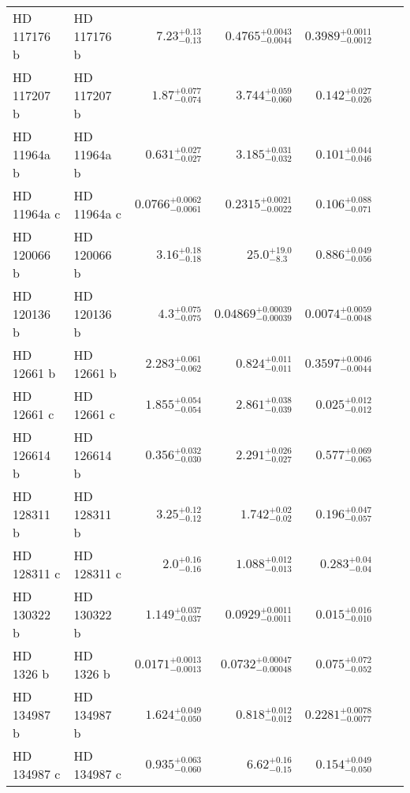 \begin{longtable*}{llrrrrr}
HD 117176 b & HD 117176 b & $7.23^{+0.13}_{-0.13}$ & $0.4765^{+0.0043}_{-0.0044}$ & $0.3989^{+0.0011}_{-0.0012}$ & \cite{Naef04} & \\ 
HD 117207 b & HD 117207 b & $1.87^{+0.077}_{-0.074}$ & $3.744^{+0.059}_{-0.060}$ & $0.142^{+0.027}_{-0.026}$ & \cite{Marcy05} & \\ 
HD 11964a b & HD 11964a b & $0.631^{+0.027}_{-0.027}$ & $3.185^{+0.031}_{-0.032}$ & $0.101^{+0.044}_{-0.046}$ & \cite{Butler06} & \\ 
HD 11964a c & HD 11964a c & $0.0766^{+0.0062}_{-0.0061}$ & $0.2315^{+0.0021}_{-0.0022}$ & $0.106^{+0.088}_{-0.071}$ & \cite{Wright09} & \\ 
HD 120066 b & HD 120066 b & $3.16^{+0.18}_{-0.18}$ & $25.0^{+19.0}_{-8.3}$ & $0.886^{+0.049}_{-0.056}$ & \cite{Blunt19} & \\ 
HD 120136 b & HD 120136 b & $4.3^{+0.075}_{-0.075}$ & $0.04869^{+0.00039}_{-0.00039}$ & $0.0074^{+0.0059}_{-0.0048}$ & \cite{Butler97} & \\ 
HD 12661 b & HD 12661 b & $2.283^{+0.061}_{-0.062}$ & $0.824^{+0.011}_{-0.011}$ & $0.3597^{+0.0046}_{-0.0044}$ & \cite{Fischer01} & \\ 
HD 12661 c & HD 12661 c & $1.855^{+0.054}_{-0.054}$ & $2.861^{+0.038}_{-0.039}$ & $0.025^{+0.012}_{-0.012}$ & \cite{Butler06} & \\ 
HD 126614 b & HD 126614 b & $0.356^{+0.032}_{-0.030}$ & $2.291^{+0.026}_{-0.027}$ & $0.577^{+0.069}_{-0.065}$ & \cite{Howard10} & \\ 
HD 128311 b & HD 128311 b & $3.25^{+0.12}_{-0.12}$ & $1.742^{+0.02}_{-0.02}$ & $0.196^{+0.047}_{-0.057}$ & \cite{Butler03} & \\ 
HD 128311 c & HD 128311 c & $2.0^{+0.16}_{-0.16}$ & $1.088^{+0.012}_{-0.013}$ & $0.283^{+0.04}_{-0.04}$ & \cite{Vogt05} & \\ 
HD 130322 b & HD 130322 b & $1.149^{+0.037}_{-0.037}$ & $0.0929^{+0.0011}_{-0.0011}$ & $0.015^{+0.016}_{-0.010}$ & \cite{Udry00} & \\ 
HD 1326 b & HD 1326 b & $0.0171^{+0.0013}_{-0.0013}$ & $0.0732^{+0.00047}_{-0.00048}$ & $0.075^{+0.072}_{-0.052}$ & \cite{Howard14} & \\ 
HD 134987 b & HD 134987 b & $1.624^{+0.049}_{-0.050}$ & $0.818^{+0.012}_{-0.012}$ & $0.2281^{+0.0078}_{-0.0077}$ & \cite{Butler01} & \\ 
HD 134987 c & HD 134987 c & $0.935^{+0.063}_{-0.060}$ & $6.62^{+0.16}_{-0.15}$ & $0.154^{+0.049}_{-0.050}$ & \cite{Jones10} & \\ 

\end{longtable*}
